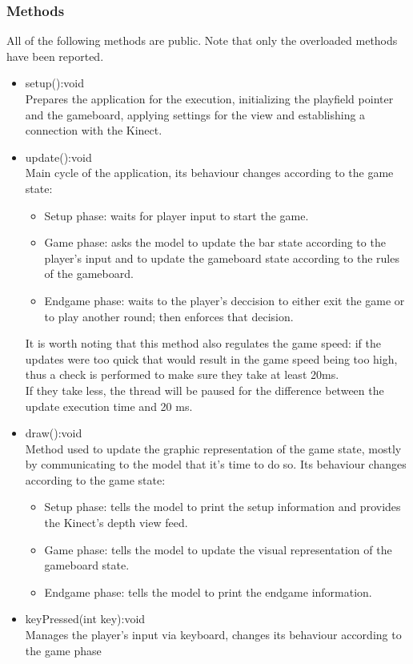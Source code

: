 \documentclass[]{article}
\begin{document}
\subsubsection{Methods}
All of the following methods are public. Note that only the overloaded methods have been reported.
	\begin{itemize}
		\item setup():void \\ Prepares the application for the execution, initializing the playfield pointer and the gameboard, applying settings for the view and establishing a connection with the Kinect.
		\item update():void \\ Main cycle of the application, its behaviour changes according to the game state:
			\begin{itemize}
				\item Setup phase: waits for player input to start the game.
				\item Game phase: asks the model to update the bar state according to the player's input and to update the gameboard state according to the rules of the gameboard.
				\item Endgame phase: waits to the player's deccision to either exit the game or to play another round; then enforces that decision.
			 \end{itemize}
			 It is worth noting that this method also regulates the game speed: if the updates were too quick that would result in the game speed being too high, thus a check is performed to make sure they take at least 20ms.\\
			 If they take less, the thread will be paused for the difference between the update execution time and 20 ms.
		\item draw():void \\ Method used to update the graphic representation of the game state, mostly by communicating to the model that it's time to do so. Its behaviour changes according to the game state:
			 \begin{itemize}
				 \item Setup phase: tells the model to print the setup information and provides the Kinect's depth view feed.
				 \item Game phase: tells the model to update the visual representation of the gameboard state.
				 \item Endgame phase: tells the model to print the endgame information.
			 \end{itemize}
		\item keyPressed(int key):void \\ Manages the player's input via keyboard, changes its behaviour according to the game phase

\end{itemize}
\end{document}
